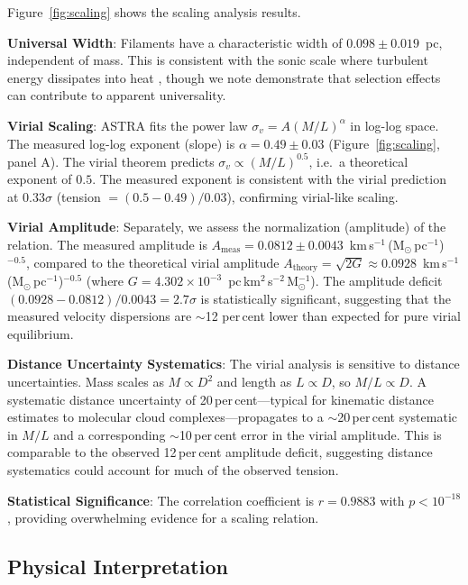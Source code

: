 \documentclass[usenatbib]{rasti}
\begin{document}
Figure~\ref{fig:scaling} shows the scaling analysis results.

\textbf{Universal Width}: Filaments have a characteristic width of $0.098 \pm 0.019$~pc, independent of mass. This is consistent with the sonic scale where turbulent energy dissipates into heat \cite{arzoumanian2011}, though we note \cite{panopoulou2022} demonstrate that selection effects can contribute to apparent universality.

\textbf{Virial Scaling}: ASTRA fits the power law $\sigma_v = A (M/L)^{\alpha}$ in log-log space. The measured log-log exponent (slope) is $\alpha = 0.49 \pm 0.03$ (Figure~\ref{fig:scaling}, panel A). The virial theorem predicts $\sigma_v \propto (M/L)^{0.5}$, i.e.\ a theoretical exponent of $0.5$. The measured exponent is consistent with the virial prediction at $0.33\sigma$ (tension $= (0.5 - 0.49)/0.03$), confirming virial-like scaling.

\textbf{Virial Amplitude}: Separately, we assess the normalization (amplitude) of the relation. The measured amplitude is $A_{\mathrm{meas}} = 0.0812 \pm 0.0043$~km\,s$^{-1}$\,(M$_{\odot}$\,pc$^{-1}$)$^{-0.5}$, compared to the theoretical virial amplitude $A_{\mathrm{theory}} = \sqrt{2G} \approx 0.0928$~km\,s$^{-1}$\,(M$_{\odot}$\,pc$^{-1}$)$^{-0.5}$ (where $G = 4.302 \times 10^{-3}$~pc\,km$^2$\,s$^{-2}$\,M$_{\odot}^{-1}$). The amplitude deficit $(0.0928 - 0.0812)/0.0043 = 2.7\sigma$ is statistically significant, suggesting that the measured velocity dispersions are $\sim$12 per\,cent lower than expected for pure virial equilibrium.

\textbf{Distance Uncertainty Systematics}: The virial analysis is sensitive to distance uncertainties. Mass scales as $M \propto D^2$ and length as $L \propto D$, so $M/L \propto D$. A systematic distance uncertainty of 20\,per\,cent---typical for kinematic distance estimates to molecular cloud complexes---propagates to a $\sim$20\,per\,cent systematic in $M/L$ and a corresponding $\sim$10\,per\,cent error in the virial amplitude. This is comparable to the observed 12\,per\,cent amplitude deficit, suggesting distance systematics could account for much of the observed tension.

\textbf{Statistical Significance}: The correlation coefficient is $r = 0.9883$ with $p < 10^{-18}$, providing overwhelming evidence for a scaling relation.

\subsection{Physical Interpretation}
\end{document}
